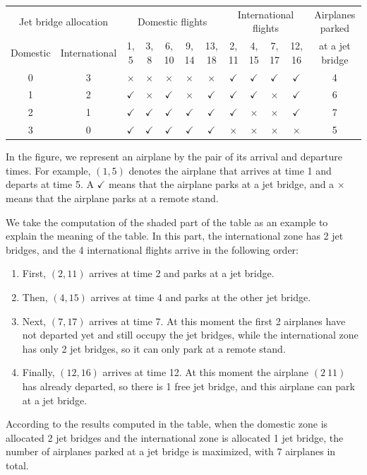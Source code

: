 \documentclass[11pt]{article}
\begin{document}
\begin{center}
\footnotesize
\setlength{\tabcolsep}{4pt}
\begin{tabular}{cc|ccccc|cccc|c}
\toprule
\multicolumn{2}{c|}{Jet bridge allocation}
& \multicolumn{5}{c|}{Domestic flights}
& \multicolumn{4}{c|}{International flights}
& Airplanes parked \\
Domestic & International
& 1, 5 & 3, 8 & 6, 10 & 9, 14 & 13, 18
& 2, 11 & 4, 15 & 7, 17 & 12, 16
& at a jet bridge \\
\midrule
0 & 3 & $\times$ & $\times$ & $\times$ & $\times$ & $\times$
& $\checkmark$ & $\checkmark$ & $\checkmark$ & $\checkmark$ & 4 \\
1 & 2 & $\checkmark$ & $\times$ & $\checkmark$ & $\times$ & $\checkmark$
& $\checkmark$ & $\checkmark$ & $\times$ & $\checkmark$ & 6 \\
2 & 1 & $\checkmark$ & $\checkmark$ & $\checkmark$ & $\checkmark$
& $\checkmark$
& $\checkmark$ & $\times$ & $\times$ & $\checkmark$ & 7 \\
3 & 0 & $\checkmark$ & $\checkmark$ & $\checkmark$ & $\checkmark$
& $\checkmark$
& $\times$ & $\times$ & $\times$ & $\times$ & 5 \\
\bottomrule
\end{tabular}
\end{center}

In the figure, we represent an airplane by the pair of its arrival and
departure times.
For example, $(1, 5)$ denotes the airplane that arrives at time 1 and
departs at time 5.
A $\checkmark$ means that the airplane parks at a jet bridge, and a
$\times$ means that the airplane parks at a remote stand.

We take the computation of the shaded part of the table as an example to
explain the meaning of the table.
In this part, the international zone has 2 jet bridges, and the 4
international flights arrive in the following order:
\begin{enumerate}
\item First, $(2, 11)$ arrives at time 2 and parks at a jet bridge.
\item Then, $(4, 15)$ arrives at time 4 and parks at the other jet bridge.
\item Next, $(7, 17)$ arrives at time 7.
  At this moment the first 2 airplanes have not departed yet and still
  occupy the jet bridges, while the international zone has only 2 jet
  bridges, so it can only park at a remote stand.
\item Finally, $(12, 16)$ arrives at time 12.
  At this moment the airplane $(2\ 11)$ has already departed, so there is
  1 free jet bridge, and this airplane can park at a jet bridge.
\end{enumerate}
According to the results computed in the table, when the domestic zone is
allocated 2 jet bridges and the international zone is allocated 1 jet
bridge, the number of airplanes parked at a jet bridge is maximized, with
7 airplanes in total.
\end{document}
